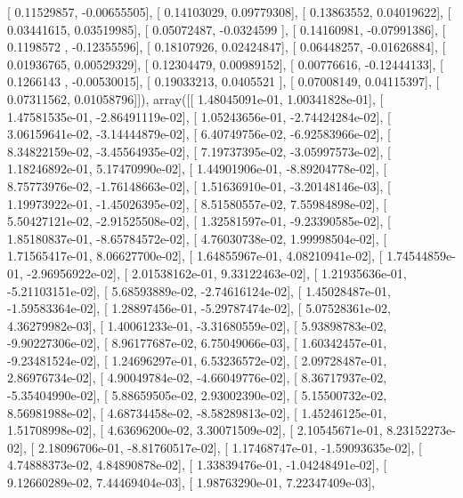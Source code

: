 \documentclass{article}
\begin{document}
       [ 0.11529857, -0.00655505],
       [ 0.14103029,  0.09779308],
       [ 0.13863552,  0.04019622],
       [ 0.03441615,  0.03519985],
       [ 0.05072487, -0.0324599 ],
       [ 0.14160981, -0.07991386],
       [ 0.1198572 , -0.12355596],
       [ 0.18107926,  0.02424847],
       [ 0.06448257, -0.01626884],
       [ 0.01936765,  0.00529329],
       [ 0.12304479,  0.00989152],
       [ 0.00776616, -0.12444133],
       [ 0.1266143 , -0.00530015],
       [ 0.19033213,  0.0405521 ],
       [ 0.07008149,  0.04115397],
       [ 0.07311562,  0.01058796]]), array([[  1.48045091e-01,   1.00341828e-01],
       [  1.47581535e-01,  -2.86491119e-02],
       [  1.05243656e-01,  -2.74424284e-02],
       [  3.06159641e-02,  -3.14444879e-02],
       [  6.40749756e-02,  -6.92583966e-02],
       [  8.34822159e-02,  -3.45564935e-02],
       [  7.19737395e-02,  -3.05997573e-02],
       [  1.18246892e-01,   5.17470990e-02],
       [  1.44901906e-01,  -8.89204778e-02],
       [  8.75773976e-02,  -1.76148663e-02],
       [  1.51636910e-01,  -3.20148146e-03],
       [  1.19973922e-01,  -1.45026395e-02],
       [  8.51580557e-02,   7.55984898e-02],
       [  5.50427121e-02,  -2.91525508e-02],
       [  1.32581597e-01,  -9.23390585e-02],
       [  1.85180837e-01,  -8.65784572e-02],
       [  4.76030738e-02,   1.99998504e-02],
       [  1.71565417e-01,   8.06627700e-02],
       [  1.64855967e-01,   4.08210941e-02],
       [  1.74544859e-01,  -2.96956922e-02],
       [  2.01538162e-01,   9.33122463e-02],
       [  1.21935636e-01,  -5.21103151e-02],
       [  5.68593889e-02,  -2.74616124e-02],
       [  1.45028487e-01,  -1.59583364e-02],
       [  1.28897456e-01,  -5.29787474e-02],
       [  5.07528361e-02,   4.36279982e-03],
       [  1.40061233e-01,  -3.31680559e-02],
       [  5.93898783e-02,  -9.90227306e-02],
       [  8.96177687e-02,   6.75049066e-03],
       [  1.60342457e-01,  -9.23481524e-02],
       [  1.24696297e-01,   6.53236572e-02],
       [  2.09728487e-01,   2.86976734e-02],
       [  4.90049784e-02,  -4.66049776e-02],
       [  8.36717937e-02,  -5.35404990e-02],
       [  5.88659505e-02,   2.93002390e-02],
       [  5.15500732e-02,   8.56981988e-02],
       [  4.68734458e-02,  -8.58289813e-02],
       [  1.45246125e-01,   1.51708998e-02],
       [  4.63696200e-02,   3.30071509e-02],
       [  2.10545671e-01,   8.23152273e-02],
       [  2.18096706e-01,  -8.81760517e-02],
       [  1.17468747e-01,  -1.59093635e-02],
       [  4.74888373e-02,   4.84890878e-02],
       [  1.33839476e-01,  -1.04248491e-02],
       [  9.12660289e-02,   7.44469404e-03],
       [  1.98763290e-01,   7.22347409e-03],
\end{document}
